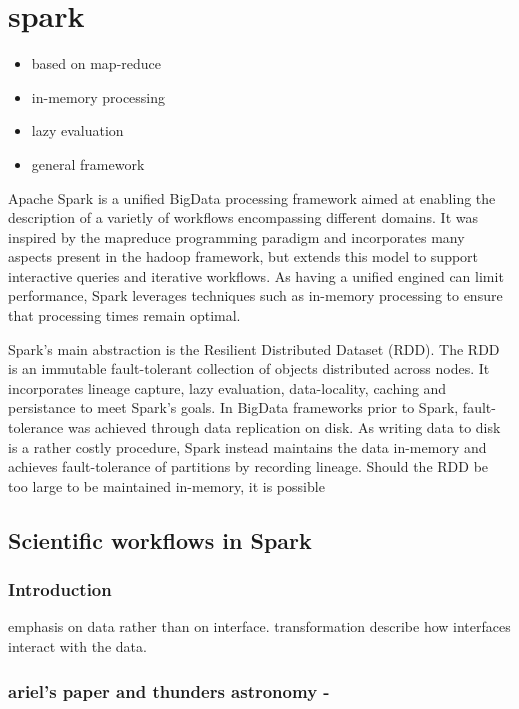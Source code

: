 \documentclass{report}
\begin{document}
    \section{spark} 
        \begin{itemize} 
            \item based on map-reduce 
            \item in-memory processing 
            \item lazy evaluation 
            \item general framework 
        \end{itemize}

        Apache Spark is a unified BigData processing framework aimed at enabling
        the description of a varietly of workflows encompassing different
        domains. It was inspired by the mapreduce programming paradigm and 
        incorporates many aspects present in the hadoop framework, but extends 
        this model to support interactive queries and iterative workflows. 
        As having a unified engined can limit performance, Spark 
        leverages techniques such as in-memory processing to ensure that 
        processing times remain optimal.

        Spark's main abstraction is the Resilient Distributed Dataset (RDD). 
        The RDD is an
        immutable fault-tolerant collection of objects distributed across nodes.
        It incorporates lineage capture, lazy evaluation, data-locality, caching
        and persistance to meet Spark's goals. In BigData frameworks prior to 
        Spark, fault-tolerance was achieved through data replication on disk.
        As writing data to disk is a rather costly procedure, Spark instead
        maintains the data in-memory and achieves fault-tolerance of partitions
        by recording lineage. Should the RDD be too large to be maintained 
        in-memory, it is possible 



    \subsection{Scientific workflows in Spark} 
        \subsubsection{Introduction}
            emphasis on data rather than on interface. transformation describe 
            how interfaces interact with the data.  
        \subsubsection{ariel's paper and thunders astronomy - } 
\end{document}

